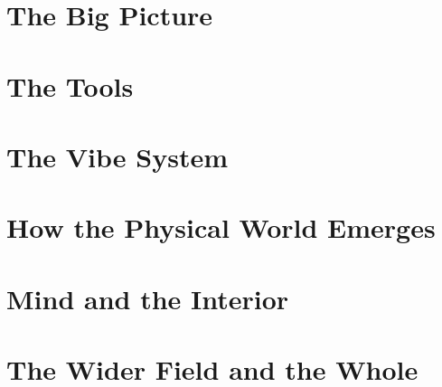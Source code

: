 \documentclass{article}
\begin{document}
\maketitle



\part{The Big Picture}



\part{The Tools}














\part{The Vibe System}








\part{How the Physical World Emerges}













\part{Mind and the Interior}








\part{The Wider Field and the Whole}










\end{document}
